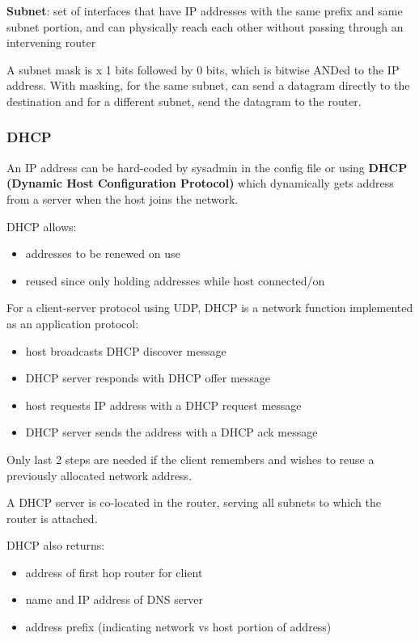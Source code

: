 \documentclass[11pt]{article}
\begin{document}
\textbf{Subnet}: set of interfaces that have IP addresses with the same
prefix and same subnet portion, and can physically reach each other
without passing through an intervening router

A subnet mask is x 1 bits followed by 0 bits, which is bitwise ANDed
to the IP address.
With masking, for the same subnet, can send a datagram directly to the
destination and for a different subnet, send the datagram to the router.
\subsubsection{DHCP}
\label{sec:org586d819}
An IP address can be hard-coded by sysadmin in the config file or using
\textbf{DHCP (Dynamic Host Configuration Protocol)} which dynamically gets
address from a server when the host joins the network.

DHCP allows:
\begin{itemize}
\item addresses to be renewed on use
\item reused since only holding addresses while host connected/on
\end{itemize}

For a client-server protocol using UDP, DHCP is a network function
implemented as an application protocol:
\begin{itemize}
\item host broadcasts DHCP discover message
\item DHCP server responds with DHCP offer message
\item host requests IP address with a DHCP request message
\item DHCP server sends the address with a DHCP ack message
\end{itemize}

Only last 2 steps are needed if the client remembers and wishes
to reuse a previously allocated network address.

A DHCP server is co-located in the router, serving all subnets to which
the router is attached.

DHCP also returns:
\begin{itemize}
\item address of first hop router for client
\item name and IP address of DNS server
\item address prefix (indicating network vs host portion of address)
\end{itemize}
\end{document}
